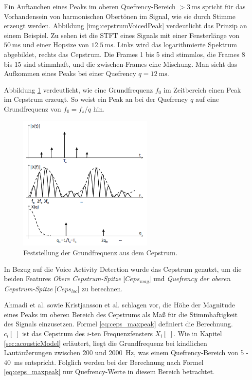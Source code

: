 Ein Auftauchen eines Peaks im oberen Quefrency-Bereich $> \SI{3}{\milli\second}$ spricht für das Vorhandensein von harmonischen Obertönen im Signal, wie sie durch Stimme erzeugt werden. Abbildung \ref{img:cepstrumVoicedPeak} verdeutlicht das Prinzip an einem Beispiel. Zu sehen ist die STFT eines Signals mit einer Fensterlänge von $\SI{50}{\milli\second}$ und einer Hopsize von $\SI{12.5}{\milli\second}$. Links wird das logarithmierte Spektrum abgebildet, rechts das Cepstrum. Die Frames 1 bis 5 sind stimmlos, die Frames 8 bis 15 sind stimmhaft, und die zwischen-Frames eine Mischung. Man sieht das Aufkommen eines Peaks bei einer Quefrency $q = \SI{12}{\milli\second}$.\cite[S. 16]{ricardo_ceps}

Abbildung \ref{img:cepstrumPitch} verdeutlicht, wie eine Grundfrequenz $f_0$ im Zeitbereich einen Peak im Cepstrum erzeugt. So weist ein Peak an bei der Quefrency $q$ auf eine Grundfrequenz von $f_0 = f_s/q$ hin.\cite{cepstrumPitchTranslation}

\begin{figure}[h]
	\centering
	\includegraphics[width=0.6\textwidth]{bilder/cepstrumPitch.png}
	\caption{Feststellung der Grundfrequenz aus dem Cepstrum. \cite{cepstrumPitchTranslation}}
	\label{img:cepstrumPitch}
\end{figure}

In Bezug auf die Voice Activity Detection wurde das Cepstrum genutzt, um die beiden Features \emph{Obere Cepstrum-Spitze} [$Ceps_{mag}$] und \emph{Quefrency der oberen Cepstrum-Spitze} [$Ceps_{loc}$] zu berechnen.

Ahmadi et al. \cite{vad_ceps} sowie Kristjansson et al.\cite{vad_Lisboa} schlagen vor, die Höhe der Magnitude eines Peaks im oberen Bereich des Cepstrums als Maß für die Stimmhaftigkeit des Signals einzusetzen. Formel \ref{eq:ceps_maxpeak} definiert die Berechnung. $c_i[\;]$ ist das Cepstrum des $i$-ten Frequenzfensters $X_i[\;]$. Wie in Kapitel \ref{sec:acousticModel} erläutert, liegt die Grundfrequenz bei kindlichen Lautäußerungen zwischen 200 und \SI{2000}{\hertz}, was einem Quefrency-Bereich von 5 - \SI{40}{\milli\second} entspricht. Folglich werden bei der Berechnung nach Formel \ref{eq:ceps_maxpeak} nur Quefrency-Werte in diesem Bereich betrachtet. 

